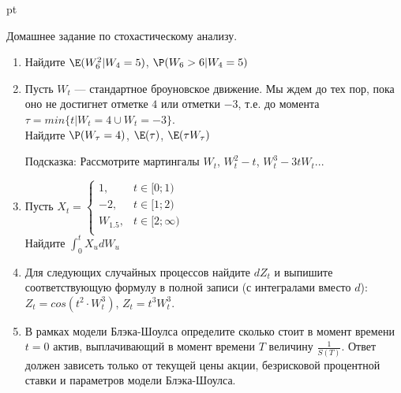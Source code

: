 \documentclass[pdftex,12pt,a4paper]{article}
\begin{document}
 pt %

Домашнее задание по стохастическому анализу. 
\begin{enumerate}
\item Найдите $\E(W_6^2|W_4=5)$, $\P(W_6>6|W_4=5)$

\item Пусть $W_{t}$ --- стандартное броуновское движение. Мы ждем до тех пор, пока оно не достигнет отметке $4$ или отметки $-3$, т.е. до момента $\tau=min\{t|W_{t}=4 \cup W_{t}=-3\}$. \\
Найдите $\P(W_{\tau}=4)$, $\E(\tau)$, $\E(\tau W_{\tau})$ 

Подсказка: Рассмотрите мартингалы $W_{t}$, $W_{t}^2-t$, $W_{t}^{3}-3tW_{t}$...

\item Пусть $X_{t}=\left\{
\begin{array}{ll}
1, & t\in[0;1) \\
-2, & t\in[1;2) \\
W_{1.5},& t\in[2;\infty) \\
\end{array}\right.$ \\
Найдите $\int_{0}^{t}X_{u}dW_{u}$ 

\item Для следующих случайных процессов найдите $dZ_{t}$ и выпишите соответствующую формулу в полной записи (с интегралами вместо $d$):  $Z_{t}=cos(t^{2}\cdot W_{t}^{3})$, $Z_{t}=t^3W^{3}_{t}$.


\item В рамках модели Блэка-Шоулса определите сколько стоит в момент времени $t=0$ актив, выплачивающий в момент времени $T$ величину $\frac{1}{S(T)}$. Ответ должен зависеть только от текущей цены акции, безрисковой процентной ставки и параметров модели Блэка-Шоулса.


\end{enumerate}
\end{document}
